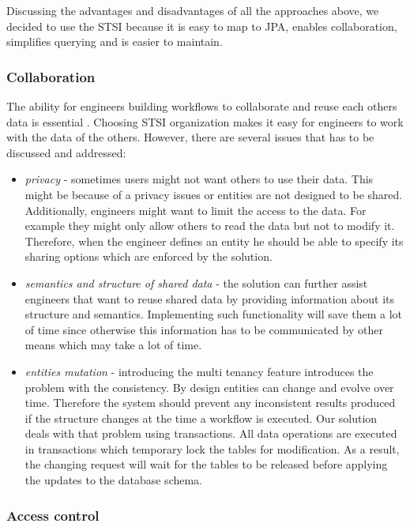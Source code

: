 Discussing the advantages and disadvantages of all the approaches above, we decided to use the STSI because it is easy to map to JPA, enables collaboration, simplifies querying and is easier to maintain.    

\subsubsection{Collaboration}
The ability for engineers building workflows to collaborate and reuse each others data is essential \cite{Lu}. Choosing STSI organization makes it easy for engineers to work with the data of the others. However, there are several issues that has to be discussed and addressed:

\begin{itemize}

	\item \textit{privacy} - sometimes users might not want others to use their data. This might be because of a privacy issues or entities are not designed to be shared. Additionally, engineers might want to limit the access to the data. For example they might only allow others to read the data but not to modify it. Therefore, when the engineer defines an entity he should be able to specify its sharing options which are enforced by the solution.
	 
	\item \textit{semantics and structure of shared data} - the solution can further assist engineers that want to reuse shared data by providing information about its structure and semantics. Implementing such functionality will save them a lot of time since otherwise this information has to be communicated by other means which may take a lot of time.
	
	\item \textit{entities mutation} - introducing the multi tenancy feature introduces the problem with the consistency. By design entities can change and evolve over time. Therefore the system should prevent any inconsistent results produced if the structure changes at the time a workflow is executed. Our solution deals with that problem using transactions. All data operations are executed in transactions which temporary lock the tables for modification. As a result, the changing request will wait for the tables to be released before applying the updates to the database schema.
\end{itemize}


\subsubsection{Access control}

